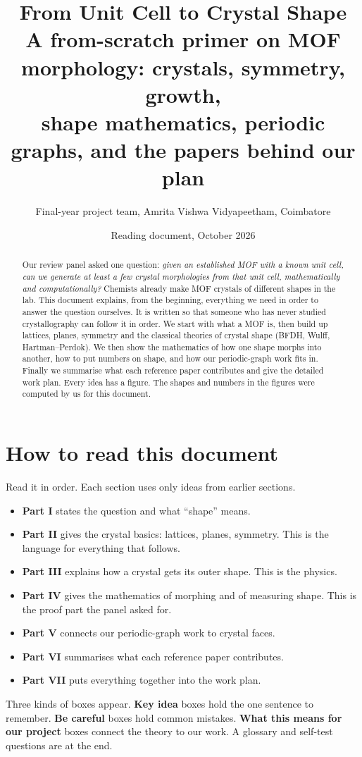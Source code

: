 \documentclass[11pt,a4paper]{article}
\title{\textbf{From Unit Cell to Crystal Shape}\\[4pt]
\large A from-scratch primer on MOF morphology: crystals, symmetry, growth,\\
shape mathematics, periodic graphs, and the papers behind our plan}
\author{Final-year project team, Amrita Vishwa Vidyapeetham, Coimbatore}
\date{Reading document, October 2026}
\theoremstyle{remark}\newtheorem*{example}{Worked example}
\begin{document}
\maketitle

\begin{abstract}
Our review panel asked one question: \emph{given an established MOF with a known unit cell, can we generate at least a few crystal morphologies from that unit cell, mathematically and computationally?} Chemists already make MOF crystals of different shapes in the lab. This document explains, from the beginning, everything we need in order to answer the question ourselves. It is written so that someone who has never studied crystallography can follow it in order. We start with what a MOF is, then build up lattices, planes, symmetry and the classical theories of crystal shape (BFDH, Wulff, Hartman--Perdok). We then show the mathematics of how one shape morphs into another, how to put numbers on shape, and how our periodic-graph work fits in. Finally we summarise what each reference paper contributes and give the detailed work plan. Every idea has a figure. The shapes and numbers in the figures were computed by us for this document.
\end{abstract}

\tableofcontents
\clearpage

\section*{How to read this document}
Read it in order. Each section uses only ideas from earlier sections.
\begin{itemize}
\item \textbf{Part I} states the question and what ``shape'' means.
\item \textbf{Part II} gives the crystal basics: lattices, planes, symmetry. This is the language for everything that follows.
\item \textbf{Part III} explains how a crystal gets its outer shape. This is the physics.
\item \textbf{Part IV} gives the mathematics of morphing and of measuring shape. This is the proof part the panel asked for.
\item \textbf{Part V} connects our periodic-graph work to crystal faces.
\item \textbf{Part VI} summarises what each reference paper contributes.
\item \textbf{Part VII} puts everything together into the work plan.
\end{itemize}
Three kinds of boxes appear. \textbf{Key idea} boxes hold the one sentence to remember. \textbf{Be careful} boxes hold common mistakes. \textbf{What this means for our project} boxes connect the theory to our work. A glossary and self-test questions are at the end.
\end{document}

